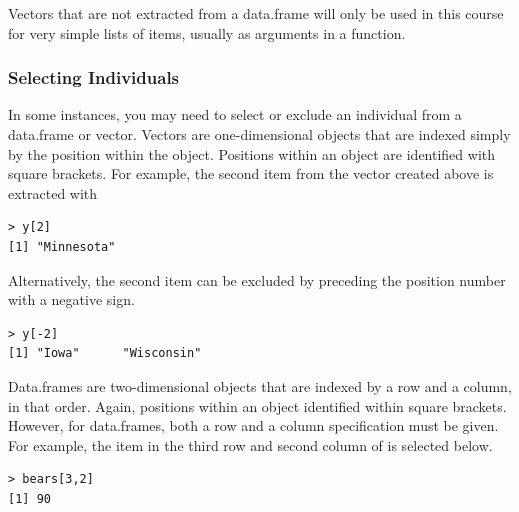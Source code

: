 \documentclass[10pt,openany]{book}\usepackage[]{graphicx}\usepackage[]{color}
\makeatletter
\newenvironment{kframe}{%
 \def\at@end@of@kframe{}%
 \ifinner\ifhmode%
  \def\at@end@of@kframe{\end{minipage}}%
  \begin{minipage}{\columnwidth}%
 \fi\fi%
 \def\FrameCommand##1{\hskip\@totalleftmargin \hskip-\fboxsep
 \colorbox{shadecolor}{##1}\hskip-\fboxsep
     \hskip-\linewidth \hskip-\@totalleftmargin \hskip\columnwidth}%
 \MakeFramed {\advance\hsize-\width
   \@totalleftmargin\z@ \linewidth\hsize
   \@setminipage}}%
 {\par\unskip\endMakeFramed%
 \at@end@of@kframe}
\newenvironment{knitrout}{}{} %
\makeatother
\begin{document}
Vectors that are not extracted from a data.frame will only be used in this course for very simple lists of items, usually as arguments in a function.


\subsubsection{Selecting Individuals}  \label{sect:RSelectIndivs}
In some instances, you may need to select or exclude an individual from a data.frame or vector. Vectors are one-dimensional objects that are indexed simply by the position within the object. Positions within an object are identified with square brackets. For example, the second item from the  vector created above is extracted with
\vspace{-4pt}
\begin{knitrout}
\color{fgcolor}\begin{kframe}
\begin{verbatim}
> y[2]
[1] "Minnesota"
\end{verbatim}
\end{kframe}
\end{knitrout}

Alternatively, the second item can be excluded by preceding the position number with a negative sign.
\vspace{-4pt}
\begin{knitrout}
\color{fgcolor}\begin{kframe}
\begin{verbatim}
> y[-2]
[1] "Iowa"      "Wisconsin"
\end{verbatim}
\end{kframe}
\end{knitrout}

Data.frames are two-dimensional objects that are indexed by a row and a column, in that order. Again, positions within an object identified within square brackets. However, for data.frames, both a row and a column specification must be given. For example, the item in the third row and second column of  is selected below.
\vspace{-4pt}
\begin{knitrout}
\color{fgcolor}\begin{kframe}
\begin{verbatim}
> bears[3,2]
[1] 90
\end{verbatim}
\end{kframe}
\end{knitrout}
\end{document}
